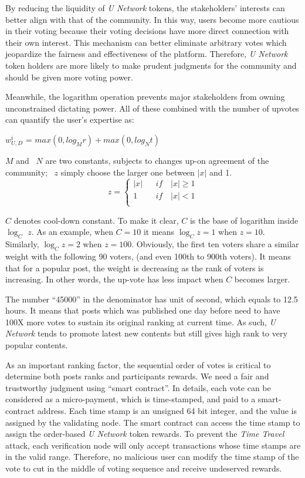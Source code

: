 By reducing the liquidity of \emph{U Network} tokens, the stakeholders' interests can better align with that of the community. In this way, users become more cautious in their voting because their voting decisions have more direct connection with their own interest. This mechanism can better eliminate arbitrary votes which jeopardize the fairness and effectiveness of the platform. Therefore, \emph{U Network} token holders are more likely to make prudent judgments for the community and should be given more voting power.

Meanwhile, the logarithm operation prevents major stakeholders from owning unconstrained dictating power.
All of these combined with the number of upvotes can quantify the user's expertise as: 
\begin{center}
        $w_{U, D}^{i}$ = $max(0, log_M r) + max (0, log_N t)$
\end{center}
$M$ and \ $N$ are two constants, subjects to changes up-on agreement of the community;
\ $z$ simply choose the larger one between $|x|$ and 1.
$$z =\left\{
\begin{array}{rcl}
|x|       &      & {if \quad |x| \geq 1}\\
1     &      & {if \quad |x| < 1}\\
\end{array} \right. $$

$C$ denotes cool-down constant. To make it clear, $C$ is the base of logarithm inside $\log_{C}$ $z$. As an example, when $C = 10$ it means $\log_{C} z = 1$ when $z = 10$. Similarly,  $\log_{C} z = 2$ when $z = 100$. Obviously, the first ten voters share a similar weight with the following 90 voters, (and even 100th to 900th voters). It means that for a popular post, the weight is decreasing as the rank of voters is increasing. In other words, the up-vote has less impact when $C$ becomes larger.

The number ``45000'' in the denominator has unit of second, which equals to 12.5 hours. It means that posts which was published one day before need to have 100X more votes to sustain its original ranking at current time. As such, \emph{U Network} tends to promote latest new contents but still gives high rank to very popular contents.  

As an important ranking factor, the sequential order of votes is critical to determine both posts ranks and participants rewards. We need a fair and trustworthy judgment using ``smart contract''. In details, each vote can be considered as a micro-payment, which is time-stamped, and paid to a smart-contract address. Each time stamp is an unsigned 64 bit integer, and the value is assigned by the validating node. The smart contract can access the time stamp to assign the order-based \emph{U Network} token rewards. To prevent the \emph{Time Travel} attack, each verification node will only accept transactions whose time stamps are in the valid range. Therefore, no malicious user can modify the time stamp of the vote to cut in the middle of voting sequence and receive undeserved rewards.  

